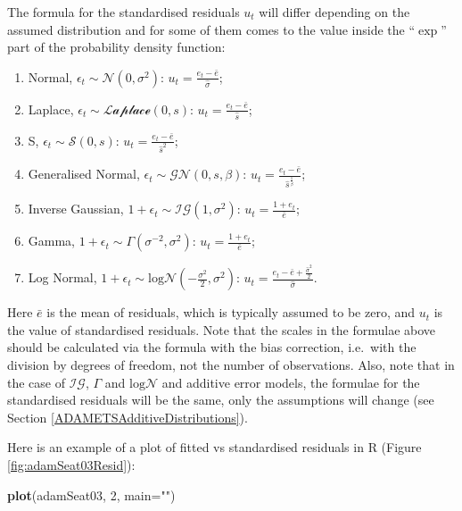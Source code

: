 \documentclass[]{book}
\newenvironment{Shaded}{\begin{snugshade}}{\end{snugshade}}
\newcommand{\DataTypeTok}[1]{\textcolor[rgb]{0.13,0.29,0.53}{#1}}
\newcommand{\DecValTok}[1]{\textcolor[rgb]{0.00,0.00,0.81}{#1}}
\newcommand{\KeywordTok}[1]{\textcolor[rgb]{0.13,0.29,0.53}{\textbf{#1}}}
\newcommand{\NormalTok}[1]{#1}
\newcommand{\StringTok}[1]{\textcolor[rgb]{0.31,0.60,0.02}{#1}}
\providecommand{\tightlist}{%
  \setlength{\itemsep}{0pt}\setlength{\parskip}{0pt}}
\theoremstyle{definition}
\theoremstyle{definition}
\theoremstyle{definition}
\theoremstyle{definition}
\theoremstyle{remark}
\begin{document}
The formula for the standardised residuals \(u_t\) will differ depending on the assumed distribution and for some of them comes to the value inside the ``\(\exp\)'' part of the probability density function:

\begin{enumerate}
\def\labelenumi{\arabic{enumi}.}
\tightlist
\item
  Normal, \(\epsilon_t \sim \mathcal{N}(0, \sigma^2)\): \(u_t = \frac{e_t -\bar{e}}{\hat{\sigma}}\);
\item
  Laplace, \(\epsilon_t \sim \mathcal{Laplace}(0, s)\): \(u_t = \frac{e_t -\bar{e}}{\hat{s}}\);
\item
  S, \(\epsilon_t \sim \mathcal{S}(0, s)\): \(u_t = \frac{e_t -\bar{e}}{\hat{s}^2}\);
\item
  Generalised Normal, \(\epsilon_t \sim \mathcal{GN}(0, s, \beta)\): \(u_t = \frac{e_t -\bar{e}}{\hat{s}^{\frac{1}{\beta}}}\);
\item
  Inverse Gaussian, \(1+\epsilon_t \sim \mathcal{IG}(1, \sigma^2)\): \(u_t = \frac{1+e_t}{\bar{e}}\);
\item
  Gamma, \(1+\epsilon_t \sim \mathcal{\Gamma}(\sigma^{-2}, \sigma^2)\): \(u_t = \frac{1+e_t}{\bar{e}}\);
\item
  Log Normal, \(1+\epsilon_t \sim \mathrm{log}\mathcal{N}\left(-\frac{\sigma^2}{2}, \sigma^2\right)\): \(u_t = \frac{e_t -\bar{e} +\frac{\hat{\sigma}^2}{2}}{\hat{\sigma}}\).
\end{enumerate}

Here \(\bar{e}\) is the mean of residuals, which is typically assumed to be zero, and \(u_t\) is the value of standardised residuals. Note that the scales in the formulae above should be calculated via the formula with the bias correction, i.e.~with the division by degrees of freedom, not the number of observations. Also, note that in the case of \(\mathcal{IG}\), \(\Gamma\) and \(\mathrm{log}\mathcal{N}\) and additive error models, the formulae for the standardised residuals will be the same, only the assumptions will change (see Section \ref{ADAMETSAdditiveDistributions}).

Here is an example of a plot of fitted vs standardised residuals in R (Figure \ref{fig:adamSeat03Resid}):

\begin{Shaded}
\begin{Highlighting}[]
\KeywordTok{plot}\NormalTok{(adamSeat03, }\DecValTok{2}\NormalTok{, }\DataTypeTok{main=}\StringTok{""}\NormalTok{)}
\end{Highlighting}
\end{Shaded}
\end{document}
